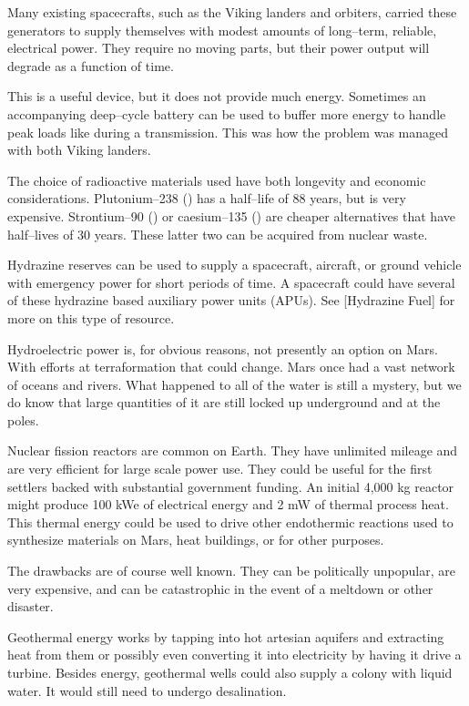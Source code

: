 Many existing spacecrafts, such as the Viking landers and orbiters, carried these generators to supply themselves with modest amounts of long--term, reliable, electrical power. They require no moving parts, but their power output will degrade as a function of time.

This is a useful device, but it does not provide much energy. Sometimes an accompanying deep--cycle battery can be used to buffer more energy to handle peak loads like during a transmission. This was how the problem was managed with both Viking landers.

The choice of radioactive materials used have both longevity and economic considerations. Plutonium--238 () has a half--life of 88 years, but is very expensive. Strontium--90 () or caesium--135 () are cheaper alternatives that have half--lives of 30 years. These latter two can be acquired from nuclear waste.

Hydrazine reserves can be used to supply a spacecraft, aircraft, or ground vehicle with emergency power for short periods of time. A spacecraft could have several of these hydrazine based auxiliary power units (APUs). See [Hydrazine Fuel] for more on this type of resource.

Hydroelectric power is, for obvious reasons, not presently an option on Mars. With efforts at terraformation that could change. Mars once had a vast network of oceans and rivers. What happened to all of the water is still a mystery, but we do know that large quantities of it are still locked up underground and at the poles.

Nuclear fission reactors are common on Earth. They have unlimited mileage and are very efficient for large scale power use. They could be useful for the first settlers backed with substantial government funding. An initial 4,000 kg reactor might produce 100 kWe of electrical energy and 2 mW of thermal process heat. This thermal energy could be used to drive other endothermic reactions used to synthesize materials on Mars, heat buildings, or for other purposes.

The drawbacks are of course well known. They can be politically unpopular, are very expensive, and can be catastrophic in the event of a meltdown or other disaster.

Geothermal energy works by tapping into hot artesian aquifers and extracting heat from them or possibly even converting it into electricity by having it drive a turbine. Besides energy, geothermal wells could also supply a colony with liquid water. It would still need to undergo desalination.

